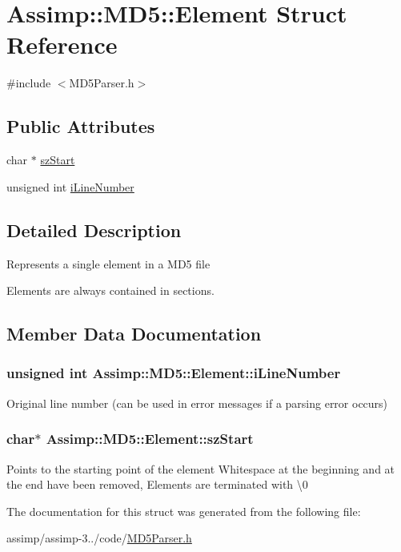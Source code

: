 \hypertarget{struct_assimp_1_1_m_d5_1_1_element}{\section{Assimp\+:\+:M\+D5\+:\+:Element Struct Reference}
\label{struct_assimp_1_1_m_d5_1_1_element}
}


{\ttfamily \#include $<$M\+D5\+Parser.\+h$>$}

\subsection*{Public Attributes}
\begin{DoxyCompactItemize}
\item 
char $\ast$ \hyperlink{struct_assimp_1_1_m_d5_1_1_element_a5853f924a5b65910417c48f1f9d08eb9}{sz\+Start}
\item 
unsigned int \hyperlink{struct_assimp_1_1_m_d5_1_1_element_af290a91caf4235d5c426f1d15ed3d897}{i\+Line\+Number}
\end{DoxyCompactItemize}


\subsection{Detailed Description}
Represents a single element in a M\+D5 file

Elements are always contained in sections. 

\subsection{Member Data Documentation}
\hypertarget{struct_assimp_1_1_m_d5_1_1_element_af290a91caf4235d5c426f1d15ed3d897}{
\subsubsection[{i\+Line\+Number}]{\setlength{\rightskip}{0pt plus 5cm}unsigned int Assimp\+::\+M\+D5\+::\+Element\+::i\+Line\+Number}}\label{struct_assimp_1_1_m_d5_1_1_element_af290a91caf4235d5c426f1d15ed3d897}
Original line number (can be used in error messages if a parsing error occurs) \hypertarget{struct_assimp_1_1_m_d5_1_1_element_a5853f924a5b65910417c48f1f9d08eb9}{
\subsubsection[{sz\+Start}]{\setlength{\rightskip}{0pt plus 5cm}char$\ast$ Assimp\+::\+M\+D5\+::\+Element\+::sz\+Start}}\label{struct_assimp_1_1_m_d5_1_1_element_a5853f924a5b65910417c48f1f9d08eb9}
Points to the starting point of the element Whitespace at the beginning and at the end have been removed, Elements are terminated with \textbackslash{}0 

The documentation for this struct was generated from the following file\+:\begin{DoxyCompactItemize}
\item 
assimp/assimp-\/3../code/\hyperlink{_m_d5_parser_8h}{M\+D5\+Parser.\+h}\end{DoxyCompactItemize}
